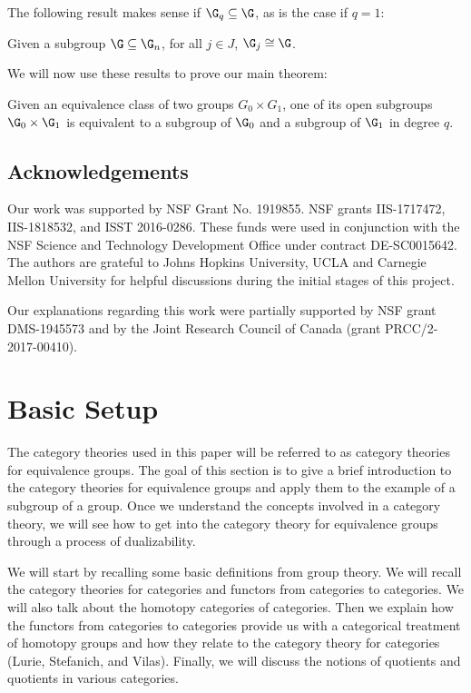 \documentclass[a4paper,reqno,oneside]{article}
\begin{document}
The following result makes sense if $\G_q \subseteq \G$, as is the case if $q=1$: 

\begin{theorem}\label{th:Riemann}
    Given a subgroup $\G \subseteq \G_n$, for all $j \in J$, $\G_j \cong \G$. 
\end{theorem}

We will now use these results to prove our main theorem: 

\begin{theorem}\label{th:Riemann1}
	Given an equivalence class of two groups $G_0 \times G_1$, one of its open subgroups $\G_0 \times \G_1$ is equivalent to a subgroup of $\G_0$ and a subgroup of $\G_1$ in degree $q$. 
\end{theorem}

\subsection*{Acknowledgements} Our work was supported by NSF Grant No. 1919855. NSF grants IIS-1717472, IIS-1818532, and ISST 2016-0286. These funds were used in conjunction with the NSF Science and Technology Development Office under contract DE-SC0015642. The authors are grateful to Johns Hopkins University, UCLA and Carnegie Mellon University for helpful discussions during the initial stages of this project. 

Our explanations regarding this work were partially supported by NSF grant DMS-1945573 and by the Joint Research Council of Canada (grant PRCC/2-2017-00410).

\section{Basic Setup}
The category theories used in this paper will be referred to as category theories for equivalence groups.  The goal of this section is to give a brief introduction to the category theories for equivalence groups and apply them to the example of a subgroup of a group.  Once we understand the concepts involved in a category theory, we will see how to get into the category theory for equivalence groups through a process of dualizability. 

We will start by recalling some basic definitions from group theory.  We will recall the category theories for categories and functors from categories to categories. We will also talk about the homotopy categories of categories. Then we explain how the functors from categories to categories provide us with a categorical treatment of homotopy groups and how they relate to the category theory for categories (Lurie, Stefanich, and Vilas). Finally, we will discuss the notions of quotients and quotients in various categories. 
\end{document}
